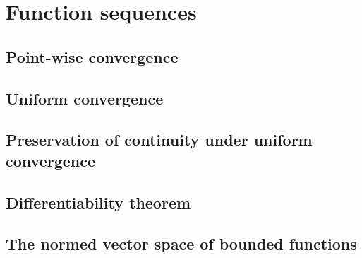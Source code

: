 \section{Function sequences}

\subsection{Point-wise convergence}

\subsection{Uniform convergence}

\subsection{Preservation of continuity under uniform convergence}

\subsection{Differentiability theorem}

\subsection{The normed vector space of bounded functions}
